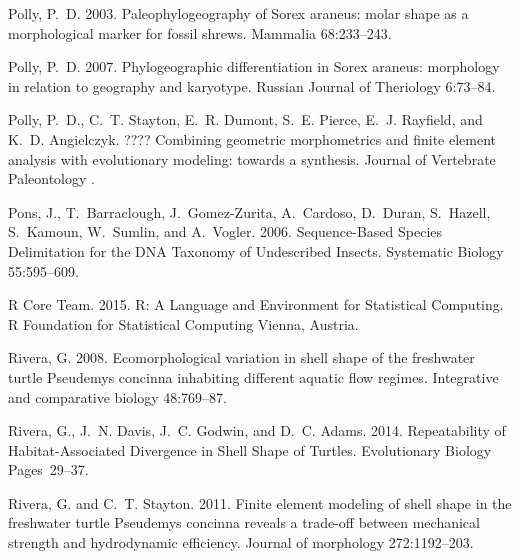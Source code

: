 \documentclass[12pt,letterpaper]{article}
\begin{document}
\begin{thebibliography}{77}
    Polly, P.~D. 2003. {Paleophylogeography of Sorex araneus: molar shape as a
    morphological marker for fossil shrews}. Mammalia 68:233--243.

    Polly, P.~D. 2007. {Phylogeographic differentiation in Sorex araneus:
    morphology in relation to geography and karyotype}. Russian Journal of
    Theriology 6:73--84.

    Polly, P.~D., C.~T. Stayton, E.~R. Dumont, S.~E. Pierce, E.~J. Rayfield, and
    K.~D. Angielczyk. ???? {Combining geometric morphometrics and finite element
    analysis with evolutionary modeling: towards a synthesis}. Journal of
    Vertebrate Paleontology .

    Pons, J., T.~Barraclough, J.~Gomez-Zurita, A.~Cardoso, D.~Duran, S.~Hazell,
    S.~Kamoun, W.~Sumlin, and A.~Vogler. 2006. {Sequence-Based Species
    Delimitation for the DNA Taxonomy of Undescribed Insects}. Systematic Biology
    55:595--609.

    {R Core Team}. 2015. R: A Language and Environment for Statistical Computing. R
    Foundation for Statistical Computing Vienna, Austria.

    Rivera, G. 2008. {Ecomorphological variation in shell shape of the freshwater
    turtle Pseudemys concinna inhabiting different aquatic flow regimes.}
    Integrative and comparative biology 48:769--87.

    Rivera, G., J.~N. Davis, J.~C. Godwin, and D.~C. Adams. 2014. {Repeatability of
    Habitat-Associated Divergence in Shell Shape of Turtles}. Evolutionary
    Biology Pages~29--37.

    Rivera, G. and C.~T. Stayton. 2011. {Finite element modeling of shell shape in
      the freshwater turtle Pseudemys concinna reveals a trade-off between
    mechanical strength and hydrodynamic efficiency.} Journal of morphology
    272:1192--203.


\end{thebibliography}
\end{document}
